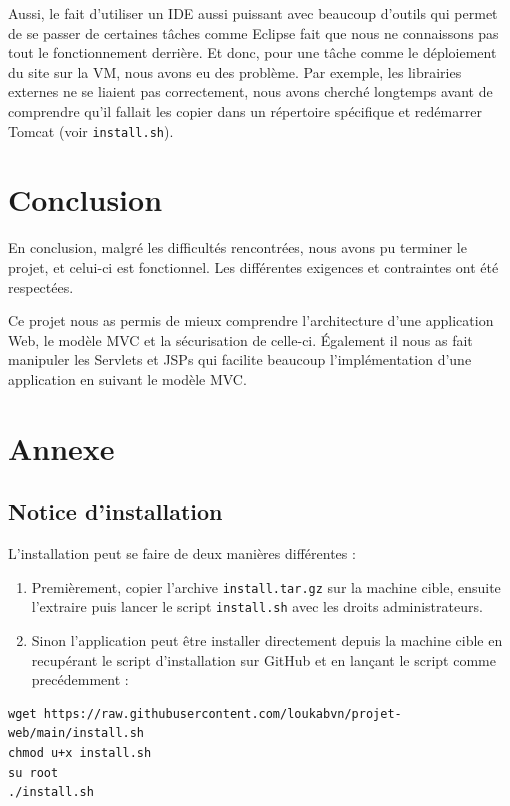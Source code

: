 Aussi, le fait d'utiliser un IDE aussi puissant avec beaucoup d'outils qui permet de se passer de
certaines tâches comme Eclipse fait que nous ne connaissons pas tout le fonctionnement derrière.
Et donc, pour une tâche comme le déploiement du site sur la VM, nous avons eu des problème. Par
exemple, les librairies externes ne se liaient pas correctement, nous avons cherché longtemps
avant de comprendre qu'il fallait les copier dans un répertoire spécifique et redémarrer Tomcat
(voir \verb:install.sh:).


\chapter{Conclusion}
En conclusion, malgré les difficultés rencontrées, nous avons pu terminer le projet, et celui-ci
est fonctionnel. Les différentes exigences et contraintes ont été respectées.

Ce projet nous as permis de mieux comprendre l'architecture d'une application Web, le modèle
MVC et la sécurisation de celle-ci. Également il nous as fait manipuler les Servlets et JSPs
qui facilite beaucoup l'implémentation d'une application en suivant le modèle MVC.

\chapter{Annexe}

\section{Notice d'installation}

L'installation peut se faire de deux manières différentes :

\begin{enumerate}
    \item Premièrement, copier l'archive \verb:install.tar.gz: sur la machine cible, ensuite
        l'extraire puis lancer le script \verb:install.sh: avec les droits administrateurs.

    \item Sinon l'application peut être installer directement depuis la machine cible en recupérant
        le script d'installation sur GitHub et en lançant le script comme precédemment :
\end{enumerate}

\begin{verbatim}
wget https://raw.githubusercontent.com/loukabvn/projet-web/main/install.sh
chmod u+x install.sh
su root
./install.sh
\end{verbatim}

